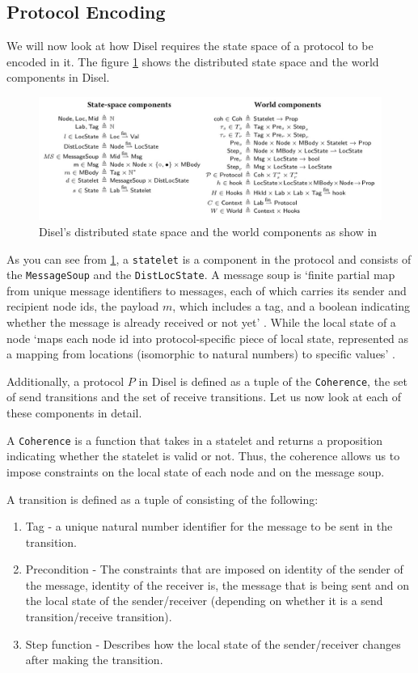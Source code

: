 \subsection{Protocol Encoding}
We will now look at how Disel requires the state space of a protocol to be encoded in it.
The figure \ref{fig:DiselStateSpace} shows the distributed state space and the world
components in Disel.

\begin{figure}
\centering
\includegraphics[width=\textwidth]{figures/disel_state_space.jpeg}
\caption{Disel's distributed state space and the world components as show in \cite{9}
\label{fig:DiselStateSpace}}
\end{figure}

As you can see from \ref{fig:DiselStateSpace}, a \texttt{statelet} is a component
in the protocol and consists of the \texttt{MessageSoup}
and the \texttt{DistLocState}. A message soup is `finite partial map from unique message
identifiers to messages,
each of which carries its sender and recipient node ids, the payload $m$, which
includes a tag, and a boolean indicating whether the message is already received
or not yet' \cite{9}. While the local state of a node
`maps each node id into protocol-specific piece of local state, represented as a
mapping from locations (isomorphic to natural numbers) to specific values' \cite{9}.

Additionally, a protocol $P$ in Disel is defined as a tuple
of the \texttt{Coherence}, the set of send transitions and the set of receive transitions.
Let us now look at each of these components in detail.

A \texttt{Coherence} is a function that takes in a statelet and returns a proposition
indicating whether the statelet is valid or not. Thus, the coherence allows us
to impose constraints on the local state of each node and on the message soup.

A transition is defined as a tuple of consisting of the following:
\begin{enumerate}
  \item Tag - a unique natural number identifier for the message to be sent in the transition.
  \item Precondition - The constraints that are imposed on identity of the sender of the message,
    identity of the receiver is, the message that is being sent and on the local state of
    the sender/receiver (depending on whether it is a send transition/receive transition).
  \item Step function - Describes how the local state of the sender/receiver changes after
    making the transition.
\end{enumerate}

